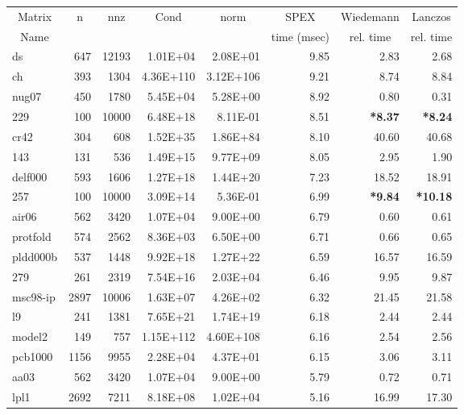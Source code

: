 \documentclass[10pt]{article}
\newcommand{\red}{
	\color{red}	
	}
\begin{document}
\newpage
\begin{longtable}{|l|r|r|r|r|r|r|r|}
\hline	
\multicolumn{1}{|c|}{Matrix} &
\multicolumn{1}{c|}{n} &
\multicolumn{1}{c|}{nnz} &
\multicolumn{1}{c|}{Cond} &
\multicolumn{1}{c|}{norm} &
\multicolumn{1}{c|}{SPEX} &
\multicolumn{1}{c|}{Wiedemann} &
\multicolumn{1}{c|}{Lanczos}  \\
\multicolumn{1}{|c|}{Name} &
\multicolumn{1}{c|}{ } &
\multicolumn{1}{c|}{ } &
\multicolumn{1}{c|}{ } &
\multicolumn{1}{c|}{ } &
\multicolumn{1}{c|}{time (msec)} &
\multicolumn{1}{c|}{rel. time} &
\multicolumn{1}{c|}{rel. time } \\
\hline
\endhead
ds	&	647	&	12193	&	1.01E+04	&	2.08E+01	&	9.85	&	2.83	&	2.68	\\
ch	&	393	&	1304	&	4.36E+110	&	3.12E+106	&	9.21	&	8.74	&	8.84	\\
nug07	&	450	&	1780	&	5.45E+04	&	5.28E+00	&	8.92	&	0.80	&	0.31	\\
229	&	100	&	10000	&	6.48E+18	&	8.11E-01	&	8.51	&	{\bf \red *8.37}	&	{\bf \red *8.24}	\\
cr42	&	304	&	608	&	1.52E+35	&	1.86E+84	&	8.10	&	40.60	&	40.68	\\
143	&	131	&	536	&	1.49E+15	&	9.77E+09	&	8.05	&	2.95	&	1.90	\\
delf000	&	593	&	1606	&	1.27E+18	&	1.44E+20	&	7.23	&	18.52	&	18.91	\\
257	&	100	&	10000	&	3.09E+14	&	5.36E-01	&	6.99	&	{\bf \red *9.84} 	&	{\bf \red *10.18} 	\\
air06	&	562	&	3420	&	1.07E+04	&	9.00E+00	&	6.79	&	0.60	&	0.61	\\
protfold	&	574	&	2562	&	8.36E+03	&	6.50E+00	&	6.71	&	0.66	&	0.65	\\
pldd000b	&	537	&	1448	&	9.92E+18	&	1.27E+22	&	6.59	&	16.57	&	16.59	\\
279	&	261	&	2319	&	7.54E+16	&	2.03E+04	&	6.46	&	9.95	&	9.87	\\
msc98-ip	&	2897	&	10006	&	1.63E+07	&	4.26E+02	&	6.32	&	21.45	&	21.58	\\
l9	&	241	&	1381	&	7.65E+21	&	1.74E+19	&	6.18	&	2.44	&	2.44	\\
model2	&	149	&	757	&	1.15E+112	&	4.60E+108	&	6.16	&	2.54	&	2.56	\\
pcb1000	&	1156	&	9955	&	2.28E+04	&	4.37E+01	&	6.15	&	3.06	&	3.11	\\
aa03	&	562	&	3420	&	1.07E+04	&	9.00E+00	&	5.79	&	0.72	&	0.71	\\
lpl1	&	2692	&	7211	&	8.18E+08	&	1.02E+04	&	5.16	&	16.99	&	17.30	\\

\end{longtable}
\end{document}
